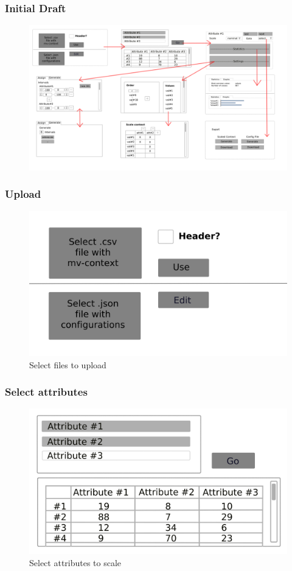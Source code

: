 \documentclass[]{beamer}
\begin{document}
	\begin{frame}
		\frametitle{Initial Draft}
		\begin{figure}[H]
			\includegraphics[width=\linewidth]{../mock_up/combi.png}
			\label{fig:p1}
		\end{figure}
	\end{frame}

	\begin{frame}
		\frametitle{Upload}
		\begin{figure}[H]
			\includegraphics[width=\linewidth]{../mock_up/panel-1.png}
			\caption{Select files to upload}
			\label{fig:p1}
		\end{figure}
	\end{frame}

	\begin{frame}
		\frametitle{Select attributes}
		\begin{figure}[H]
			\includegraphics[width=\linewidth]{../mock_up/panel-2.png}
			\caption{Select attributes to scale}
			\label{fig:p1}
		\end{figure}
	\end{frame}
\end{document}
